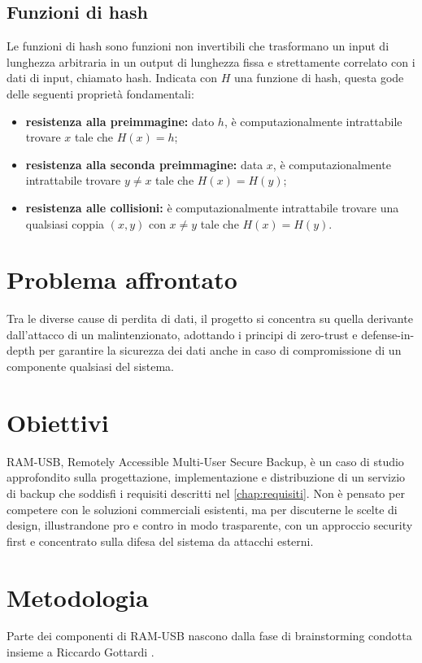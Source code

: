 \subsection{Funzioni di hash}

Le funzioni di hash sono funzioni non invertibili che trasformano un input di lunghezza
arbitraria in un output di lunghezza fissa e strettamente correlato con i dati di input, chiamato hash.
Indicata con $H$ una funzione di hash, questa gode delle seguenti proprietà fondamentali:

\begin{itemize}
    \item \textbf{resistenza alla preimmagine:} dato $h$, è computazionalmente intrattabile trovare $x$
    tale che $H(x) = h$;
    \item \textbf{resistenza alla seconda preimmagine:} data $x$, è computazionalmente intrattabile
    trovare $y \neq x$ tale che $H(x) = H(y)$;
    \item \textbf{resistenza alle collisioni:} è computazionalmente intrattabile trovare una qualsiasi coppia
    $(x, y)$ con $x \neq y$ tale che $H(x) = H(y)$.
\end{itemize}


\section{Problema affrontato}

Tra le diverse cause di perdita di dati, il progetto si concentra su quella derivante dall'attacco di un 
malintenzionato, adottando i principi di zero-trust e defense-in-depth per garantire la 
sicurezza dei dati anche in caso di compromissione di un componente qualsiasi del sistema.

\section{Obiettivi}

RAM-USB, Remotely Accessible Multi-User Secure Backup, è un caso di studio approfondito sulla progettazione, 
implementazione e distribuzione di un servizio di backup che soddisfi i requisiti
descritti nel \autoref{chap:requisiti}. Non è pensato per competere con le soluzioni 
commerciali esistenti, ma per discuterne le scelte di design, illustrandone pro e contro in modo 
trasparente, con un approccio security first e concentrato sulla difesa del sistema da attacchi esterni.


\section{Metodologia}
Parte dei componenti di RAM-USB nascono dalla fase di brainstorming condotta insieme a Riccardo 
Gottardi \cite{gottardi-github}.

